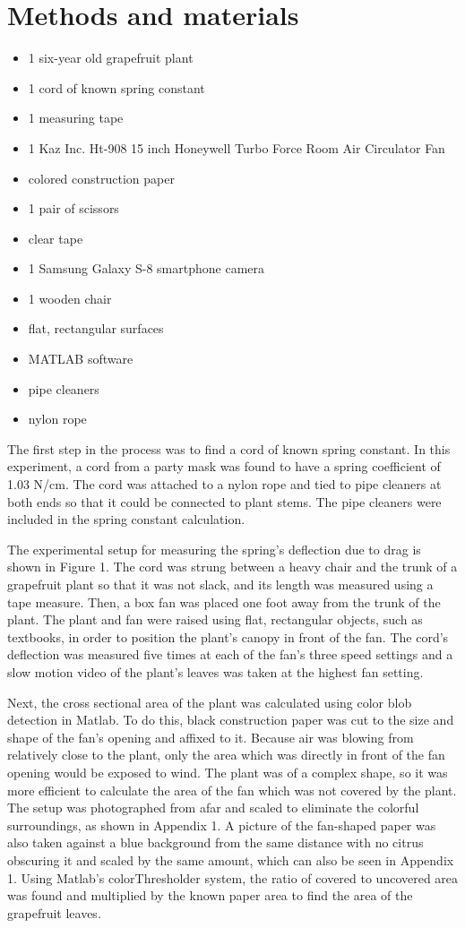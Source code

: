 \documentclass[]{article}
\begin{document}
\section{Methods and materials}
\begin{itemize}
\item 1 six-year old grapefruit plant
\item 1 cord of known spring constant
\item 1 measuring tape
\item 1 Kaz Inc. Ht-908 15 inch Honeywell Turbo Force Room Air Circulator Fan
\item colored construction paper
\item 1 pair of scissors
\item clear tape
\item 1 Samsung Galaxy S-8 smartphone camera
\item 1 wooden chair
\item flat, rectangular surfaces
\item MATLAB software
\item pipe cleaners
\item nylon rope
\end{itemize}

	The first step in the process was to find a cord of known spring constant. In this experiment, a cord from a party mask was found to have a spring coefficient of 1.03 N/cm. The cord was attached to a nylon rope and tied to pipe cleaners at both ends so that it could be connected to plant stems. The pipe cleaners were included in the spring constant calculation.

	The experimental setup for measuring the spring's deflection due to drag is shown in Figure 1. The cord was strung between a heavy chair and the trunk of a grapefruit plant so that it was not slack, and its length was measured using a tape measure. Then, a box fan was placed one foot away from the trunk of the plant. The plant and fan were raised using flat, rectangular objects, such as textbooks, in order to position the plant's canopy in front of the fan. The cord's deflection was measured five times at each of the fan's three speed settings and a slow motion video of the plant's leaves was taken at the highest fan setting.

	Next, the cross sectional area of the plant was calculated using color blob detection in Matlab. To do this, black construction paper was cut to the size and shape of the fan's opening and affixed to it. Because air was blowing from relatively close to the plant, only the area which was directly in front of the fan opening would be exposed to wind. The plant was of a complex shape, so it was more efficient to calculate the area of the fan which was not covered by the plant. The setup was photographed from afar and scaled to eliminate the colorful surroundings, as shown in Appendix 1. A picture of the fan-shaped paper was also taken against a blue background from the same distance with no citrus obscuring it and scaled by the same amount, which can also be seen in Appendix 1. Using Matlab's colorThresholder system, the ratio of covered to uncovered area was found and multiplied by the known paper area to find the area of the grapefruit leaves.
\end{document}
